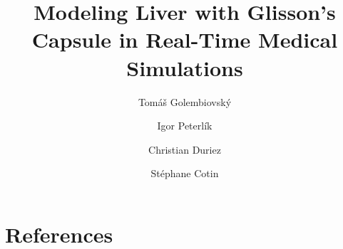 \documentclass[final,times,twocolumn,3p]{elsarticle}
\title{Modeling Liver with Glisson's Capsule in Real-Time Medical Simulations}
\author[Masaryk]{Tom\'a\v{s} Golembiovsk\'y}
\author[IHU]{Igor Peterl\'ik}
\author[Inria]{Christian Duriez}
\author[Inria]{St\'ephane Cotin}
\begin{document}
%
%
%
%
%
%
%
%
%
%
%
\section{References}%
%

%
%
%
%
\end{document}
